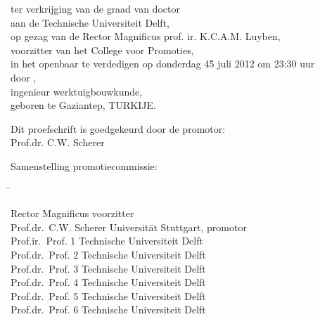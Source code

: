 \smallskip{}


\begin{center}
ter verkrijging van de graad van doctor\\
aan de Technische Universiteit Delft,\\
op gezag van de Rector Magnificus prof. ir. K.C.A.M. Luyben,\\
voorzitter van het College voor Promoties,\\
in het openbaar te verdedigen op donderdag 45 juli 2012 om 23:30 uur\\
door \theauthor,\\
ingenieur werktuigbouwkunde,\\
geboren te Gaziantep, TURKIJE.
\end{center}

\newpage %
\thispagestyle{empty}

\noindent Dit proefschrift is goedgekeurd door de promotor:\\
Prof.dr. C.W. Scherer\\
\bigskip{}

\noindent Samenstelling promotiecommissie:
\smallskip{}
\noindent
\begin{flushleft}\begin{tabbing}
\hspace*{70mm}\=\kill

Rector Magnificus \> voorzitter\\
Prof.dr.\ C.W. Scherer \> Universit\"{a}t Stuttgart, promotor\\
Prof.ir.\ Prof. 1 \> Technische Universiteit Delft\\
Prof.dr.\ Prof. 2 \> Technische Universiteit Delft\\
Prof.dr.\ Prof. 3 \> Technische Universiteit Delft\\
Prof.dr.\ Prof. 4 \> Technische Universiteit Delft\\
Prof.dr.\ Prof. 5 \> Technische Universiteit Delft\\
Prof.dr.\ Prof. 6 \> Technische Universiteit Delft\\
\end{tabbing}\end{flushleft}

